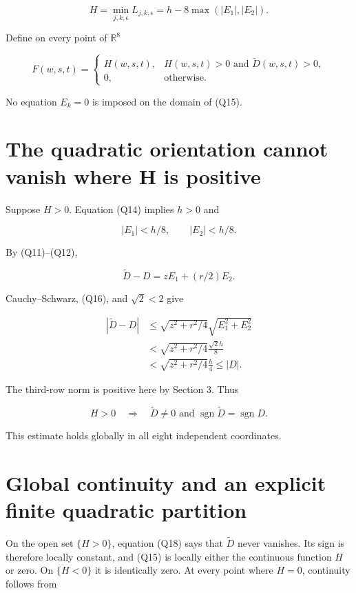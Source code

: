 \documentclass[11pt]{article}
\begin{document}
\[
H=\min_{j,k,\epsilon}L_{j,k,\epsilon}
=h-8\max(|E_1|,|E_2|).
\tag{Q14}
\]

Define on every point of \(\mathbb R^8\)

\[
F(w,s,t)=
\begin{cases}
H(w,s,t),&H(w,s,t)>0\text{ and }\widetilde D(w,s,t)>0,\\
0,&\text{otherwise}.
\end{cases}
\tag{Q15}
\]

No equation \(E_k=0\) is imposed on the domain of (Q15).

\section{The quadratic orientation cannot vanish where H is positive}

Suppose \(H>0\). Equation (Q14) implies \(h>0\) and

\[
|E_1|<h/8,\qquad |E_2|<h/8.
\tag{Q16}
\]

By (Q11)--(Q12),

\[
\widetilde D-D=zE_1+(r/2)E_2.
\]

Cauchy--Schwarz, (Q16), and \(\sqrt2<2\) give

\[
\begin{aligned}
|\widetilde D-D|
&\le\sqrt{z^2+r^2/4}\sqrt{E_1^2+E_2^2}\\
&<\sqrt{z^2+r^2/4}\frac{\sqrt2 h}{8}\\
&<\sqrt{z^2+r^2/4}\frac h4
\le |D|.
\end{aligned}
\tag{Q17}
\]

The third-row norm is positive here by Section 3. Thus

\[
H>0\quad\Longrightarrow\quad
\widetilde D\ne0\text{ and }\operatorname{sgn}\widetilde D
=\operatorname{sgn}D.
\tag{Q18}
\]

This estimate holds globally in all eight independent coordinates.

\section{Global continuity and an explicit finite quadratic partition}

On the open set \(\{H>0\}\), equation (Q18) says that
\(\widetilde D\) never vanishes. Its sign is therefore locally
constant, and (Q15) is locally either the continuous function \(H\) or
zero. On \(\{H<0\}\) it is identically zero. At every point where
\(H=0\), continuity follows from
\end{document}

